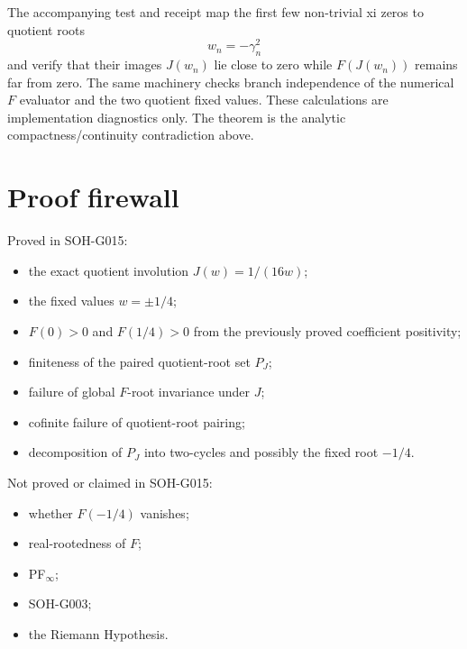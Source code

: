 The accompanying test and receipt map the first few non-trivial xi zeros to
quotient roots
\[
 w_n=-\gamma_n^2
\]
and verify that their images $J(w_n)$ lie close to zero while
$F(J(w_n))$ remains far from zero.  The same machinery checks branch
independence of the numerical $F$ evaluator and the two quotient fixed values.
These calculations are implementation diagnostics only.  The theorem is the
analytic compactness/continuity contradiction above.

\section{Proof firewall}

Proved in SOH-G015:
\begin{itemize}
 \item the exact quotient involution $J(w)=1/(16w)$;
 \item the fixed values $w=\pm1/4$;
 \item $F(0)>0$ and $F(1/4)>0$ from the previously proved coefficient positivity;
 \item finiteness of the paired quotient-root set $P_J$;
 \item failure of global $F$-root invariance under $J$;
 \item cofinite failure of quotient-root pairing;
 \item decomposition of $P_J$ into two-cycles and possibly the fixed root $-1/4$.
\end{itemize}

Not proved or claimed in SOH-G015:
\begin{itemize}
 \item whether $F(-1/4)$ vanishes;
 \item real-rootedness of $F$;
 \item PF$_\infty$;
 \item SOH-G003;
 \item the Riemann Hypothesis.
\end{itemize}
